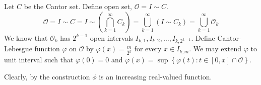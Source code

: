 \begin{definition}
	Let $C$ be the Cantor set.
	Define open set, $\mathcal{O} = I \sim C$.
	\[ \mathcal{O} = I \sim C = I \sim \left( \bigcap_{k=1}^\infty C_k \right) = \bigcup_{k=1}^\infty \left( I \sim C_k \right) = \bigcup_{k=1}^\infty \mathcal{O}_k \]
	We know that $\mathcal{O}_k$ has $2^{k-1}$ open intervals $I_{k,1}, I_{k,2},\dots,I_{k,2^{k-1}}$.
	Define Cantor-Lebesgue function $\varphi$ on $\mathcal{O}$ by $\varphi(x) = \frac{m}{2^k}$ for every $x \in I_{k,m}$.
	We may extend $\varphi$ to unit interval such that $\varphi(0) = 0$ and $\varphi(x) = \sup \left\{ \varphi(t) : t \in [0,x] \cap \mathcal{O} \right\}$.
\end{definition}

Clearly, by the construction $\phi$ is an increasing real-valued function.

